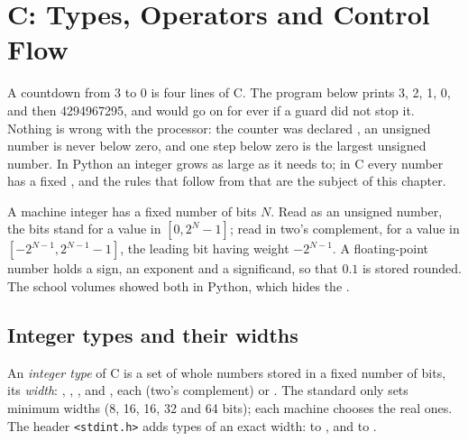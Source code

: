 \chapter{C: Types, Operators and Control Flow}\label{ch:b1:c-types-and-control}

A countdown from 3 to 0 is four lines of C. The program below prints 3, 2, 1, 0, and then 4294967295, and would
go on for ever if a guard did not stop it. Nothing is wrong with the processor: the counter was declared
, an unsigned number is never below zero, and one step below zero is the largest unsigned number.
In Python an integer grows as large as it needs to; in C every number has a fixed , and the rules that
follow from that  are the subject of this chapter.

\label{lst:b1:c-types-and-control:countdown}

\label{out:b1:c-types-and-control:countdown}

\begin{recall}
A machine integer has a fixed number of bits $N$. Read as an unsigned number, the bits stand for a value in
$[0, 2^N - 1]$; read in two's complement, for a value in $[-2^{N-1}, 2^{N-1} - 1]$, the leading bit having weight
$-2^{N-1}$. A floating-point number holds a sign, an exponent and a significand, so that $0.1$ is stored rounded.
The school volumes showed both in Python, which hides the .
\end{recall}

\section{Integer types and their widths}\label{sec:b1:c-types-and-control:integers}

\begin{definition}\label{def:b1:c-types-and-control:integer-type}
An \emph{integer type} of C is a set of whole numbers stored in a fixed number of bits, its
\emph{width}: , , ,  and
, each  (two's complement) or . The standard only sets minimum widths
(8, 16, 16, 32 and 64 bits); each machine chooses the real ones. The header \texttt{<stdint.h>} adds types of an
exact width:  to , and  to .
\end{definition}

